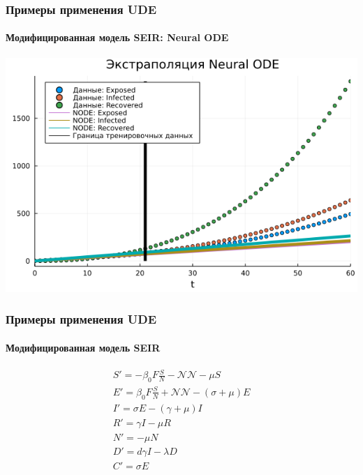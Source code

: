 \documentclass[10pt,pdf,hyperref={unicode}]{beamer}
\begin{document}
			\begin{frame}
				\frametitle{Примеры применения UDE} 
				\framesubtitle{Модифицированная модель SEIR: Neural ODE}
				\begin{center}
					\includegraphics[width=0.8\linewidth]{neuralode_extrapolation.png}
				\end{center}
			\end{frame}
			
			
			\begin{frame}
				\frametitle{Примеры применения UDE} 
				\framesubtitle{Модифицированная модель SEIR}
				\begin{center}
					\begin{displaymath}
					\begin{gathered}
					S' = -\beta_0 F \frac{S}{N} - \mathcal{NN} - \mu S \\
					E' = \beta_0 F \frac{S}{N} + \mathcal{NN} - (\sigma + \mu)E\\
					I' = \sigma E - (\gamma + \mu) I\\
					R' = \gamma I - \mu R\\
					N' = -\mu N\\
					D' = d\gamma I - \lambda D\\
					C' = \sigma E
					\end{gathered}
					\end{displaymath}
				\end{center}
			\end{frame}
		
\end{document}
